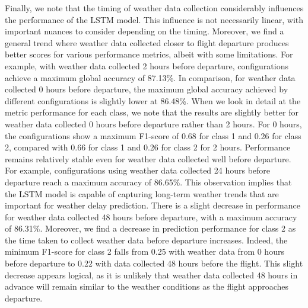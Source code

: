 \documentclass[12pt,oneside]{book} %
\begin{document}
\noindent Finally, we note that the timing of weather data collection considerably influences the performance of the LSTM model. This influence is not necessarily linear, with important nuances to consider depending on the timing. Moreover, we find a general trend where weather data collected closer to flight departure produces better scores for various performance metrics, albeit with some limitations. For example, with weather data collected 2 hours before departure, configurations achieve a maximum global accuracy of 87.13\%. In comparison, for weather data collected 0 hours before departure, the maximum global accuracy achieved by different configurations is slightly lower at 86.48\%. When we look in detail at the metric performance for each class, we note that the results are slightly better for weather data collected 0 hours before departure rather than 2 hours. For 0 hours, the configurations show a maximum F1-score of 0.68 for class 1 and 0.26 for class 2, compared with 0.66 for class 1 and 0.26 for class 2 for 2 hours. Performance remains relatively stable even for weather data collected well before departure. For example, configurations using weather data collected 24 hours before departure reach a maximum accuracy of 86.65\%. This observation implies that the LSTM model is capable of capturing long-term weather trends that are important for weather delay prediction. There is a slight decrease in performance for weather data collected 48 hours before departure, with a maximum accuracy of 86.31\%. Moreover, we find a decrease in prediction performance for class 2 as the time taken to collect weather data before departure increases. Indeed, the minimum F1-score for class 2 falls from 0.25 with weather data from 0 hours before departure to 0.22 with data collected 48 hours before the flight. This slight decrease appears logical, as it is unlikely that weather data collected 48 hours in advance will remain similar to the weather conditions as the flight approaches departure.
\end{document}
